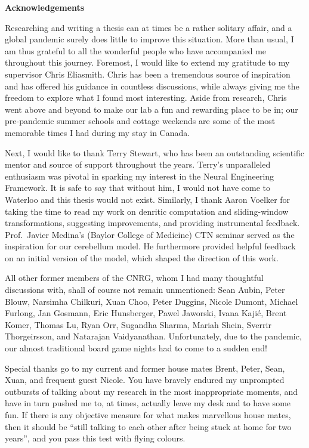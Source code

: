 \begin{center}\textbf{Acknowledgements}\end{center}

Researching and writing a thesis can at times be a rather solitary affair, and a global pandemic surely does little to improve this situation.
More than usual, I am thus grateful to all the wonderful people who have accompanied me throughout this journey.
Foremost, I would like to extend my gratitude to my supervisor Chris Eliasmith.
Chris has been a tremendous source of inspiration and has offered his guidance in countless discussions, while always giving me the freedom to explore what I found most interesting.
Aside from research, Chris went above and beyond to make our lab a fun and rewarding place to be in; our pre-pandemic summer schools and cottage weekends are some of the most memorable times I had during my stay in Canada.

Next, I would like to thank Terry Stewart, who has been an outstanding scientific mentor and source of support throughout the years.
Terry's unparalleled enthusiasm was pivotal in sparking my interest in the Neural Engineering Framework.
It is safe to say that without him, I would not have come to Waterloo and this thesis would not exist.
Similarly, I thank Aaron Voelker for taking the time to read my work on denritic computation and sliding-window transformations, suggesting improvements, and providing instrumental feedback.
Prof.~Javier Medina's (Baylor College of Medicine) CTN seminar served as the inspiration for our cerebellum model.
He furthermore provided helpful feedback on an initial version of the model, which shaped the direction of this work.

All other former members of the CNRG, whom I had many thoughtful discussions with, shall of course not remain unmentioned: Sean Aubin, Peter Blouw, Narsimha Chilkuri, Xuan Choo, Peter Duggins, Nicole Dumont, Michael Furlong, Jan Gosmann, Eric Hunsberger, Pawel Jaworski, Ivana Kajić, Brent Komer, Thomas Lu, Ryan Orr, Sugandha Sharma, Mariah Shein, Sverrir Thorgeirsson, and Natarajan Vaidyanathan.
Unfortunately, due to the pandemic, our almost traditional board game nights had to come to a sudden end!

Special thanks go to my current and former house mates Brent, Peter, Sean, Xuan, and frequent guest Nicole.
You have bravely endured my unprompted outbursts of talking about my research in the most inappropriate moments, and have in turn pushed me to, at times, actually leave my desk and to have some fun.
If there is any objective measure for what makes marvellous house mates, then it should be \enquote{still talking to each other after being stuck at home for two years}, and you pass this test with flying colours.

